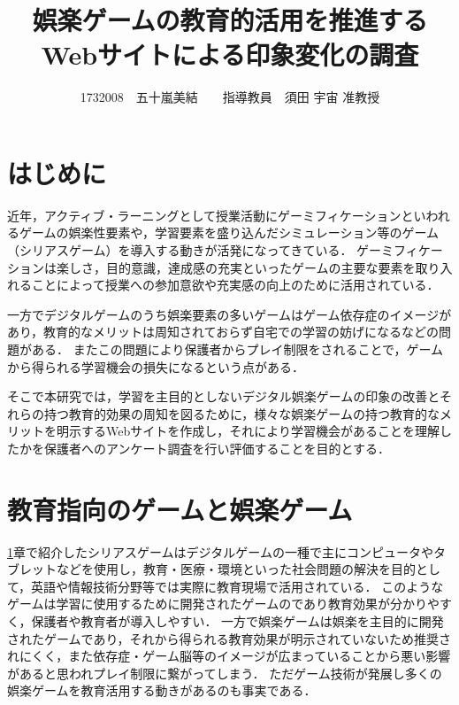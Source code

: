 \documentclass[twocolumn,10pt,a4j]{ltjsarticle}
\title{娯楽ゲームの教育的活用を推進するWebサイトによる印象変化の調査}
\author{1732008　五十嵐美結　　指導教員　須田 宇宙 准教授}
\date{}
\begin{document}
\maketitle

\section{はじめに}\label{introduction}


近年，アクティブ・ラーニングとして授業活動にゲーミフィケーションといわれるゲームの娯楽性要素や，学習要素を盛り込んだシミュレーション等のゲーム（シリアスゲーム）を導入する動きが活発になってきている．
ゲーミフィケーションは楽しさ，目的意識，達成感の充実といったゲームの主要な要素を取り入れることによって授業への参加意欲や充実感の向上のために活用されている．


一方でデジタルゲームのうち娯楽要素の多いゲームはゲーム依存症のイメージがあり，教育的なメリットは周知されておらず自宅での学習の妨げになるなどの問題がある．
またこの問題により保護者からプレイ制限をされることで，ゲームから得られる学習機会の損失になるという点がある．

そこで本研究では，学習を主目的としないデジタル娯楽ゲームの印象の改善とそれらの持つ教育的効果の周知を図るために，様々な娯楽ゲームの持つ教育的なメリットを明示するWebサイトを作成し，それにより学習機会があることを理解したかを保護者へのアンケート調査を行い評価することを目的とする．

\section{教育指向のゲームと娯楽ゲーム}

\ref{introduction}章で紹介したシリアスゲームはデジタルゲームの一種で主にコンピュータやタブレットなどを使用し，教育・医療・環境といった社会問題の解決を目的として，英語や情報技術分野等では実際に教育現場で活用されている．
このようなゲームは学習に使用するために開発されたゲームのであり教育効果が分かりやすく，保護者や教育者が導入しやすい．
一方で娯楽ゲームは娯楽を主目的に開発されたゲームであり，それから得られる教育効果が明示されていないため推奨されにくく，また依存症・ゲーム脳等のイメージが広まっていることから悪い影響があると思われプレイ制限に繋がってしまう．
ただゲーム技術が発展し多くの娯楽ゲームを教育活用する動きがあるのも事実である．\cite{tvgame}
\end{document}
